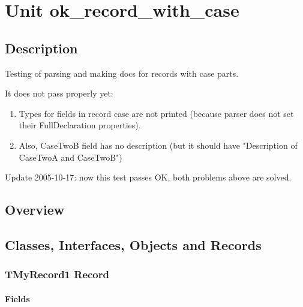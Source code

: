 \documentclass{report}
\begin{document}
\newlength{\tmplength}
\chapter{Unit ok{\_}record{\_}with{\_}case}
\section{Description}
Testing of parsing and making docs for records with case parts.\hfill\vspace*{1ex}



It does not pass properly yet: \begin{enumerate}
\setcounter{enumi}{0} \setcounter{enumii}{0} \setcounter{enumiii}{0} \setcounter{enumiv}{0} 
\item Types for fields in record case are not printed (because parser does not set their FullDeclaration properties).
\setcounter{enumi}{1} \setcounter{enumii}{1} \setcounter{enumiii}{1} \setcounter{enumiv}{1} 
\item Also, CaseTwoB field has no description (but it should have "Description of CaseTwoA and CaseTwoB")
\end{enumerate}

Update 2005{-}10{-}17: now this test passes OK, both problems above are solved.
\section{Overview}
\begin{description}
\item[\texttt{\begin{ttfamily}TMyRecord1\end{ttfamily} Record}]
\item[\texttt{\begin{ttfamily}TMyRecord2\end{ttfamily} Record}]
\end{description}
\section{Classes, Interfaces, Objects and Records}
\subsection*{TMyRecord1 Record}
\subsubsection*{\large{\textbf{Fields}}\normalsize\hspace{1ex}\hfill}
\end{document}
